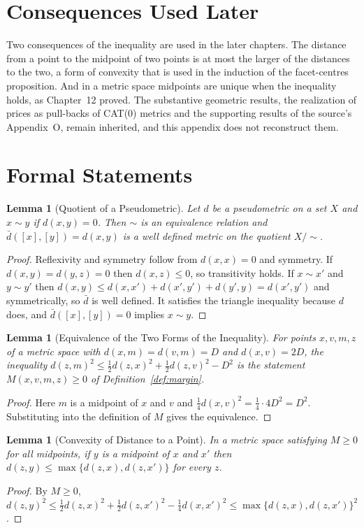 \documentclass[11pt,letterpaper]{report}
\theoremstyle{plain}
\newtheorem{lemma}[theorem]{Lemma}
\theoremstyle{definition}
\theoremstyle{remark}
\begin{document}
\section{Consequences Used Later}

Two consequences of the inequality are used in the later chapters. The distance from a point to the midpoint of two points is at most the larger of the distances to the two, a form of convexity that is used in the induction of the facet-centres proposition. And in a metric space midpoints are unique when the inequality holds, as Chapter~12 proved. The substantive geometric results, the realization of prices as pull-backs of CAT(0) metrics and the supporting results of the source's Appendix~O, remain inherited, and this appendix does not reconstruct them.

\section{Formal Statements}

\begin{lemma}[Quotient of a Pseudometric]\label{lem:pseudoquot}
Let $d$ be a pseudometric on a set $X$ and $x\sim y$ if $d(x,y)=0$. Then $\sim$ is an equivalence relation and $\bar d([x],[y])=d(x,y)$ is a well defined metric on the quotient $X/{\sim}$.
\end{lemma}
\begin{proof}
Reflexivity and symmetry follow from $d(x,x)=0$ and symmetry. If $d(x,y)=d(y,z)=0$ then $d(x,z)\le0$, so transitivity holds. If $x\sim x'$ and $y\sim y'$ then $d(x,y)\le d(x,x')+d(x',y')+d(y',y)=d(x',y')$ and symmetrically, so $\bar d$ is well defined. It satisfies the triangle inequality because $d$ does, and $\bar d([x],[y])=0$ implies $x\sim y$.
\end{proof}

\begin{lemma}[Equivalence of the Two Forms of the Inequality]\label{lem:cnforms}
For points $x,v,m,z$ of a metric space with $d(x,m)=d(v,m)=D$ and $d(x,v)=2D$, the inequality $d(z,m)^2\le\tfrac12d(z,x)^2+\tfrac12d(z,v)^2-D^2$ is the statement $M(x,v,m,z)\ge0$ of Definition~\ref{def:margin}.
\end{lemma}
\begin{proof}
Here $m$ is a midpoint of $x$ and $v$ and $\tfrac14d(x,v)^2=\tfrac14\cdot4D^2=D^2$. Substituting into the definition of $M$ gives the equivalence.
\end{proof}

\begin{lemma}[Convexity of Distance to a Point]\label{lem:quasiconvex}
In a metric space satisfying $M\ge0$ for all midpoints, if $y$ is a midpoint of $x$ and $x'$ then $d(z,y)\le\max\{d(z,x),d(z,x')\}$ for every $z$.
\end{lemma}
\begin{proof}
By $M\ge0$, $d(z,y)^2\le\tfrac12d(z,x)^2+\tfrac12d(z,x')^2-\tfrac14d(x,x')^2\le\max\{d(z,x),d(z,x')\}^2$.
\end{proof}
\end{document}
